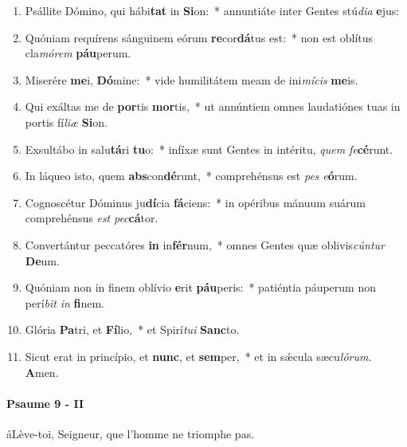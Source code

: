 \documentclass[twoside]{article}
\begin{document}
\begin{paracol}[1]{2}
\begin{enumerate}[wide, itemsep=0mm, labelwidth=!, labelindent=0pt, label=\color{gregoriocolor}\theenumi]
\item Psállite Dómino, qui hábi\textbf{tat} in \textbf{Si}on:~* annuntiáte inter Gentes stú\textit{di}\textit{a} \textbf{e}jus:
\item Quóniam requírens sánguinem eórum \textbf{re}cor\textbf{dá}tus est:~* non est oblítus cla\textit{mó}\textit{rem} \textbf{páu}perum.
\item Miserére \textbf{me}i, \textbf{Dó}mine:~* vide humilitátem meam de ini\textit{mí}\textit{cis} \textbf{me}is.
\item Qui exáltas me de \textbf{por}tis \textbf{mor}tis,~* ut annúntiem omnes laudatiónes tuas in portis fí\textit{li}\textit{æ} \textbf{Si}on.
\item Exsultábo in salu\textbf{tá}ri \textbf{tu}o:~* infíxæ sunt Gentes in intéritu, \textit{quem} \textit{fe}\textbf{cé}runt.
\item In láqueo isto, quem \textbf{abs}con\textbf{dé}runt,~* comprehénsus est \textit{pes} \textit{e}\textbf{ó}rum.
\item Cognoscétur Dóminus ju\textbf{dí}cia \textbf{fá}ciens:~* in opéribus mánuum suárum comprehénsus \textit{est} \textit{pec}\textbf{cá}tor.
\item Convertántur peccatóres \textbf{in} in\textbf{fér}num,~* omnes Gentes quæ oblivis\textit{cún}\textit{tur} \textbf{De}um.
\item Quóniam non in finem oblívio \textbf{e}rit \textbf{páu}peris:~* patiéntia páuperum non perí\textit{bit} \textit{in} \textbf{fi}nem.
\item Glória \textbf{Pa}tri, et \textbf{Fí}lio,~* et Spirí\textit{tu}\textit{i} \textbf{Sanc}to.
\item Sicut erat in princípio, et \textbf{nunc}, et \textbf{sem}per,~* et in sǽcula sæcu\textit{ló}\textit{rum}. \textbf{A}men.
\end{enumerate}

\switchcolumn

\paragraph{Psaume 9 - II}
\aa Lève-toi, Seigneur, que l'homme ne triomphe pas.



\end{paracol}
\end{document}
